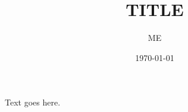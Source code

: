 \documentclass{article}
\title{TITLE}
\author{ME}
\date{\today}
\begin{document}
\maketitle

Text goes here.



\end{document}
